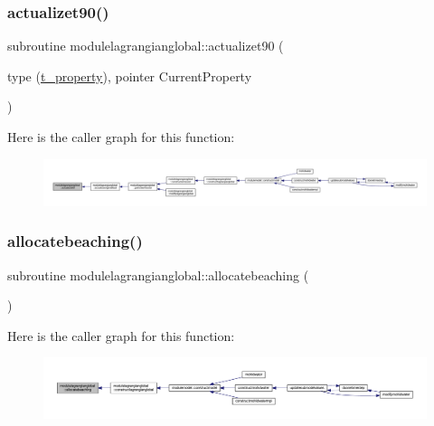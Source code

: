 \subsubsection{\texorpdfstring{actualizet90()}{actualizet90()}}
{\footnotesize\ttfamily subroutine modulelagrangianglobal\+::actualizet90 (\begin{DoxyParamCaption}\item[{type (\mbox{\hyperlink{structmodulelagrangianglobal_1_1t__property}{t\+\_\+property}}), pointer}]{Current\+Property }\end{DoxyParamCaption})\hspace{0.3cm}{\ttfamily [private]}}

Here is the caller graph for this function\+:\nopagebreak
\begin{figure}[H]
\begin{center}
\leavevmode
\includegraphics[width=350pt]{namespacemodulelagrangianglobal_a56f5f58e1be0e429b3e792cfd510ddb0_icgraph}
\end{center}
\end{figure}
\mbox{\label{namespacemodulelagrangianglobal_a48e2f7f1b1f2612fb2b891f9ae7918b4}} 
\subsubsection{\texorpdfstring{allocatebeaching()}{allocatebeaching()}}
{\footnotesize\ttfamily subroutine modulelagrangianglobal\+::allocatebeaching (\begin{DoxyParamCaption}{ }\end{DoxyParamCaption})\hspace{0.3cm}{\ttfamily [private]}}

Here is the caller graph for this function\+:\nopagebreak
\begin{figure}[H]
\begin{center}
\leavevmode
\includegraphics[width=350pt]{namespacemodulelagrangianglobal_a48e2f7f1b1f2612fb2b891f9ae7918b4_icgraph}
\end{center}
\end{figure}
\mbox{\label{namespacemodulelagrangianglobal_aa4f2e4611a6f55063b6b425e9af734c9}} 
